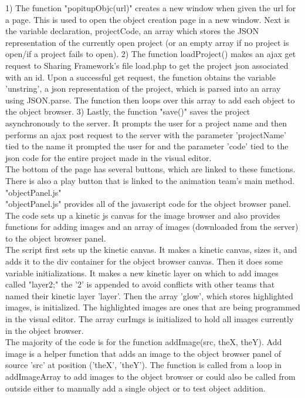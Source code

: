 \documentclass[12pt]{article}
\begin{document}
1) The function "popitupObjc(url)" creates a new window when given the url for a page. This is used to open the object creation page in a new window. Next is the variable declaration, projectCode, an array which stores the JSON representation of the currently open project (or an empty array if no project is open/if a project fails to open). 2) The function loadProject() makes an ajax get request to Sharing Framework's file load.php to get the project json associated with an id. Upon a successful get request, the function obtains the variable 'unstring', a json representation of the project, which is parsed into an array using JSON.parse. The function then loops over this array to add each object to the object browser. 3) Lastly, the function "save()" saves the project asynchronously to the server. It prompts the user for a project name and then performs an ajax post request to the server with the parameter 'projectName' tied to the name it prompted the user for and the parameter 'code' tied to the json code for the entire project made in the visual editor. \\

The bottom of the page has several buttons, which are linked to these functions. There is also a play button that is linked to the animation team's main method. \\

"objectPanel.js" \\

"objectPanel.js" provides all of the javascript code for the object browser panel. The code sets up a kinetic js canvas for the image browser and also provides functions for adding images and an array of images (downloaded from the server) to the object browser panel. \\

The script first sets up the kinetic canvas. It makes a kinetic canvas, sizes it, and adds it to the div container for the object browser canvas. Then it does some variable initializations. It makes a new kinetic layer on which to add images called "layer2;" the '2' is appended to avoid conflicts with other teams that named their kinetic layer 'layer'. Then the array 'glow', which stores highlighted images, is initialized. The highlighted images are ones that are being programmed in the visual editor. The array curImgs is initialized to hold all images currently in the object browser. \\

The majority of the code is for the function addImage(src, theX, theY). Add image is a helper function that adds an image to the object browser panel of source 'src' at position ('theX', 'theY'). The function is called from a loop in addImageArray to add images to the object browser or could also be called from outside either to manually add a single object or to test object addition. \\
\end{document}
